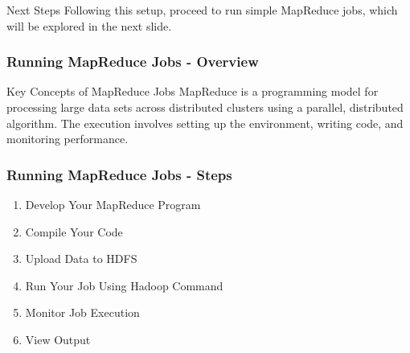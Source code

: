 \documentclass[aspectratio=169]{beamer}
\begin{document}
\begin{frame}[fragile]
    \begin{block}{Next Steps}
        Following this setup, proceed to run simple MapReduce jobs, which will be explored in the next slide.
    \end{block}
\end{frame}

\begin{frame}[fragile]
    \frametitle{Running MapReduce Jobs - Overview}
    \begin{block}{Key Concepts of MapReduce Jobs}
        MapReduce is a programming model for processing large data sets across distributed clusters using a parallel, distributed algorithm. 
        The execution involves setting up the environment, writing code, and monitoring performance.
    \end{block}
\end{frame}

\begin{frame}[fragile]
    \frametitle{Running MapReduce Jobs - Steps}
    \begin{enumerate}
        \item Develop Your MapReduce Program
        \item Compile Your Code
        \item Upload Data to HDFS
        \item Run Your Job Using Hadoop Command
        \item Monitor Job Execution
        \item View Output
    \end{enumerate}
\end{frame}
\end{document}
